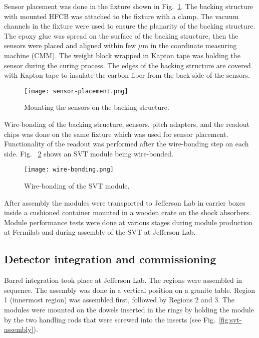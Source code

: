 Sensor placement was done in the fixture shown in Fig.~\ref{fig:sensor-placement}. The backing structure with mounted HFCB was attached to the fixture with a clamp. The vacuum channels in the fixture were used to ensure the planarity of the backing structure. The epoxy glue was spread on the surface of the backing structure, then the sensors were placed and aligned within few $\mu$m in the coordinate measuring machine (CMM). The weight block wrapped in Kapton tape was holding the sensor during the curing process. The edges of the backing structure are covered with Kapton tape to insulate the carbon fiber from the back side of the sensors. 

\begin{figure}[hbt] 
\centering 
\texttt{[image: sensor-placement.png]}
\caption{Mounting the sensors on the backing structure.}
\label{fig:sensor-placement}
\end{figure}

Wire-bonding of the backing structure, sensors, pitch adapters, and the readout chips was done on the same fixture which was used for sensor placement. Functionality of the readout was performed after the wire-bonding step on each side. Fig. ~\ref{fig:wire-bonding} shows an SVT module being wire-bonded. 

\begin{figure}[hbt] 
\centering 
\texttt{[image: wire-bonding.png]}
\caption{Wire-bonding of the SVT module.}
\label{fig:wire-bonding}
\end{figure}

After assembly the modules were transported to Jefferson Lab in carrier boxes inside a cushioned container mounted in a wooden crate on the shock absorbers. Module performance tests were done at various stages during module production at Fermilab and during assembly of the SVT at Jefferson Lab. 

\subsection{Detector integration and commissioning}

Barrel integration took place at Jefferson Lab. The regions were assembled in sequence. The assembly was done in a vertical position on a granite table. Region 1 (innermost region) was assembled first, followed by Regions 2 and 3. The modules were mounted on the dowels inserted in the rings by holding the module by the two handling rods that were screwed into the inserts (see Fig.~\ref{fig:svt-assembly}). 

